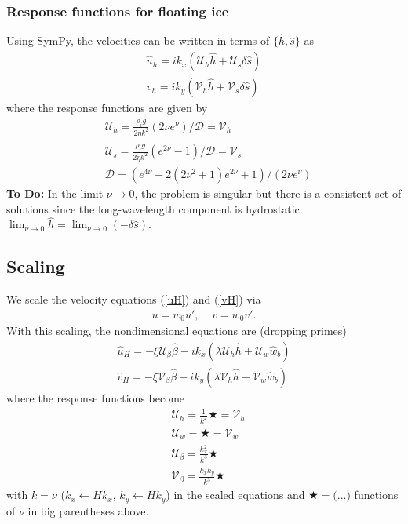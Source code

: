 \documentclass[paper=a4, fontsize=11pt]{article}
\begin{document}
\subsubsection*{Response functions for floating ice}
Using SymPy, the velocities can be written in terms of $\{\widehat{h},\widehat{s}\}$ as
\begin{align}
\widehat{u}_h =  ik_x\left(\mathcal{U}_h\widehat{h} +  \mathcal{U}_s\delta\widehat{s}\right) \label{uHf}\\
\widehat{v}_h = ik_y\left(\mathcal{V}_h\widehat{h} +  \mathcal{V}_s\delta\widehat{s}\right)\label{vHf}
\end{align}
where the response functions are given by
\begin{align}
&\mathcal{U}_h = \frac{\rho_i g}{2\eta k^2} \left( 2\nu e^{\nu} \right)/\mathcal{D}=\mathcal{V}_h\\
&\mathcal{U}_s = \frac{\rho_i g}{2\eta k^2} \left( e^{2\nu}-1 \right)/\mathcal{D}=\mathcal{V}_s\\
&\mathcal{D} = \left(e^{4\nu} -2(2\nu^2+1)e^{2\nu} +1 \right)/(2\nu e^{\nu})
\end{align}
\textbf{To Do:} In the limit $\nu\to 0$, the problem is singular but there is a consistent
set of solutions since the long-wavelength component is hydrostatic: $\lim_{\nu\to 0 }\widehat{h} = \lim_{\nu\to 0 }(-\delta\widehat{s}) $.

\subsection*{Scaling}
We scale the velocity equations (\ref{uH}) and (\ref{vH}) via
\begin{align}
u = w_0 u', \;\;\;\; v = w_0v'.
\end{align}
With this scaling, the nondimensional equations are (dropping primes)
\begin{align}
\widehat{u}_H =    -\xi\mathcal{U}_{\beta} \widehat{\beta} -ik_x\left(\lambda\mathcal{U}_h\widehat{h} +  \mathcal{U}_w\widehat{w}_b\right) \label{uHsc}\\
\widehat{v}_H =  -\xi\mathcal{V}_{\beta} \widehat{\beta}-ik_y\left(\lambda\mathcal{V}_h\widehat{h} +  \mathcal{V}_w\widehat{w}_b\right)\label{vHsc}
\end{align}
where the response functions become
\begin{align}
&\mathcal{U}_h =   \frac{1}{k^2} \bigstar   = \mathcal{V}_h \\
&\mathcal{U}_w =  \bigstar  = \mathcal{V}_w \\
&\mathcal{U}_\beta =   \frac{k_x^2}{k^3} \bigstar   \\
&\mathcal{V}_\beta =  \frac{k_x k_y}{k^3} \bigstar
\end{align}
with $k=\nu$ ($k_x \gets Hk_x$, $k_y \gets Hk_y$) in the scaled equations
and $\bigstar = \bigg(\text{...}\bigg)$ functions of $\nu$ in big parentheses above.
\end{document}
